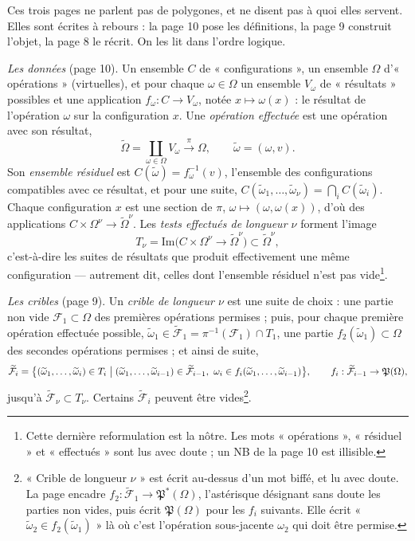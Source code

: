 \documentclass[11pt,a4paper]{article}
\begin{document}
Ces trois pages ne parlent pas de polygones, et ne disent pas à quoi elles
servent. Elles sont écrites à rebours : la page 10 pose les définitions, la
page 9 construit l'objet, la page 8 le récrit. On les lit dans l'ordre logique.

\emph{Les données} (page 10). Un ensemble $C$ de « configurations », un
ensemble $\Omega$ d'« opérations » (virtuelles), et pour chaque
$\omega \in \Omega$ un ensemble $V_\omega$ de « résultats » possibles et une
application $f_\omega : C \to V_\omega$, notée $x \mapsto \omega(x)$ : le
résultat de l'opération $\omega$ sur la configuration $x$. Une
\emph{opération effectuée} est une opération avec son résultat,
\[
  \widetilde{\Omega} = \coprod_{\omega \in \Omega} V_\omega
  \xrightarrow{\ \pi\ } \Omega ,
  \qquad \widetilde{\omega} = (\omega, v) .
\]
Son \emph{ensemble résiduel} est $C(\widetilde{\omega}) = f_\omega^{-1}(v)$,
l'ensemble des configurations compatibles avec ce résultat, et pour une suite,
$C(\widetilde{\omega}_1, \ldots, \widetilde{\omega}_\nu) = \bigcap_i
C(\widetilde{\omega}_i)$. Chaque configuration $x$ est une section de $\pi$,
$\omega \mapsto (\omega, \omega(x))$, d'où des applications
$C \times \Omega^\nu \to \widetilde{\Omega}^\nu$. Les \emph{tests effectués de
longueur $\nu$} forment l'image
\[
  T_\nu = \mathrm{Im}\bigl( C \times \Omega^\nu \to \widetilde{\Omega}^\nu
  \bigr) \subset \widetilde{\Omega}^\nu ,
\]
c'est-à-dire les suites de résultats que produit effectivement une même
configuration --- autrement dit, celles dont l'ensemble résiduel n'est pas
vide\footnote{Cette dernière reformulation est la nôtre. Les mots
« opérations », « résiduel » et « effectués » sont lus avec doute ; un NB de la
page 10 est illisible.}.

\emph{Les cribles} (page 9). Un \emph{crible de longueur $\nu$} est une suite
de choix : une partie non vide $\mathcal{F}_1 \subset \Omega$ des premières
opérations permises ; puis, pour chaque première opération effectuée possible,
$\widetilde{\omega}_1 \in \widetilde{\mathcal{F}}_1 = \pi^{-1}(\mathcal{F}_1)
\cap T_1$, une partie $f_2(\widetilde{\omega}_1) \subset \Omega$ des secondes
opérations permises ; et ainsi de suite,
\[
  \widetilde{\mathcal{F}}_i = \bigl\{ (\widetilde{\omega}_1, \ldots,
  \widetilde{\omega}_i) \in T_i \bigm| (\widetilde{\omega}_1, \ldots,
  \widetilde{\omega}_{i-1}) \in \widetilde{\mathcal{F}}_{i-1},\
  \omega_i \in f_i(\widetilde{\omega}_1, \ldots, \widetilde{\omega}_{i-1})
  \bigr\},
  \qquad
  f_i : \widetilde{\mathcal{F}}_{i-1} \to \mathfrak{P}(\Omega),
\]
jusqu'à $\widetilde{\mathcal{F}}_\nu \subset T_\nu$. Certains
$\widetilde{\mathcal{F}}_i$ peuvent être vides\footnote{« Crible de longueur
$\nu$ » est écrit au-dessus d'un mot biffé, et lu avec doute. La page encadre
$f_2 : \widetilde{\mathcal{F}}_1 \to \mathfrak{P}^*(\Omega)$, l'astérisque
désignant sans doute les parties non vides, puis écrit $\mathfrak{P}(\Omega)$
pour les $f_i$ suivants. Elle écrit
« $\widetilde{\omega}_2 \in f_2(\widetilde{\omega}_1)$ » là où c'est
l'opération sous-jacente $\omega_2$ qui doit être permise.}.
\end{document}
